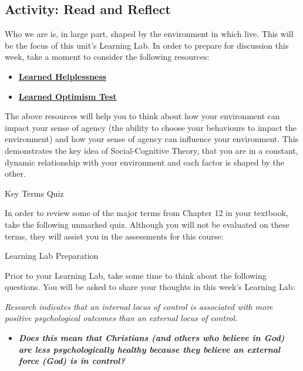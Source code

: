 \documentclass[
]{book}
\providecommand{\tightlist}{%
  \setlength{\itemsep}{0pt}\setlength{\parskip}{0pt}}
\begin{document}
\hypertarget{activity-read-and-reflect-4}{%
\subsection*{Activity: Read and Reflect}\label{activity-read-and-reflect-4}}

\begin{reflect}
Who we are is, in large part, shaped by the environment in which live. This will be the focus of this unit's Learning Lab. In order to prepare for discussion this week, take a moment to consider the following resources:

\begin{itemize}
\tightlist
\item
  \href{http://www.ldonline.org/article/6154/}{\textbf{Learned Helplessness}}\\
\item
  \href{https://web.stanford.edu/class/msande271/onlinetools/LearnedOpt.html}{\textbf{Learned Optimism Test}}
\end{itemize}

The above resources will help you to think about how your environment can impact your sense of agency (the ability to choose your behaviours to impact the environment) and how your sense of agency can influence your environment. This demonstrates the key idea of Social-Cognitive Theory, that you are in a constant, dynamic relationship with your environment and each factor is shaped by the other.

{Key Terms Quiz}

In order to review some of the major terms from Chapter 12 in your textbook, take the following unmarked quiz. Although you will not be evaluated on these terms, they will assist you in the assessments for this course:

{Learning Lab Preparation}

Prior to your Learning Lab, take some time to think about the following questions. You will be asked to share your thoughts in this week's Learning Lab:

\emph{Research indicates that an internal locus of control is associated with more positive psychological outcomes than an external locus of control.}

\begin{itemize}
\tightlist
\item
  \textbf{\emph{Does this mean that Christians (and others who believe in God) are less psychologically healthy because they believe an external force (God) is in control?}}
\end{itemize}
\end{reflect}
\end{document}
